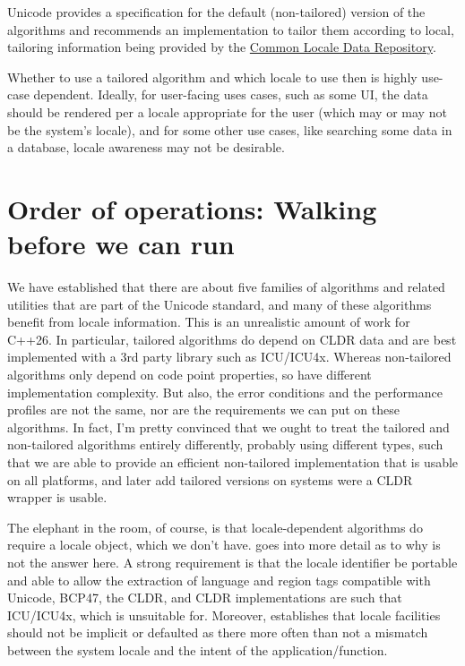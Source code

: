 \documentclass{wg21}
\begin{document}
Unicode provides a specification for the default (non-tailored) version of the algorithms and recommends an implementation to tailor them according to local, tailoring information being provided by the \href{https://cldr.Unicode.org/}{Common Locale Data Repository}.

Whether to use a tailored algorithm and which locale to use then is highly use-case dependent. Ideally, for user-facing uses cases, such as some UI,
the data should be rendered per a locale appropriate for the user (which may or may not be the system's locale), and for some other use cases, like searching some data in
a database, locale awareness may not be desirable.

\section{Order of operations: Walking before we can run}

We have established that there are about five families of algorithms and related utilities that are part of the Unicode standard, and many of these algorithms benefit from locale information. This is an unrealistic amount of work for C++26. In particular, tailored algorithms do depend on CLDR data and are best implemented with a 3rd party library
such as ICU/ICU4x.
Whereas non-tailored algorithms only depend on code point properties, so have different implementation complexity. But also, the error conditions and the performance profiles are not the same, nor are the requirements we can put on these algorithms.
In fact, I'm pretty convinced that we ought to treat the tailored and non-tailored algorithms entirely differently, probably using different types, such that we are able to provide an efficient non-tailored implementation that is usable on all platforms, and later add tailored versions on systems were a CLDR wrapper is usable.

The elephant in the room, of course, is that locale-dependent algorithms do require a locale object, which we don't have.
 goes into more detail as to why  is not the answer here.
A strong requirement is that the locale identifier be portable and able to allow the extraction of language and region tags compatible with Unicode, BCP47, the CLDR, and CLDR implementations are such that ICU/ICU4x, which  is unsuitable for.
Moreover,  establishes that locale facilities should not be implicit or defaulted as there more often than not a mismatch between the system locale and the intent of the application/function.
\end{document}
